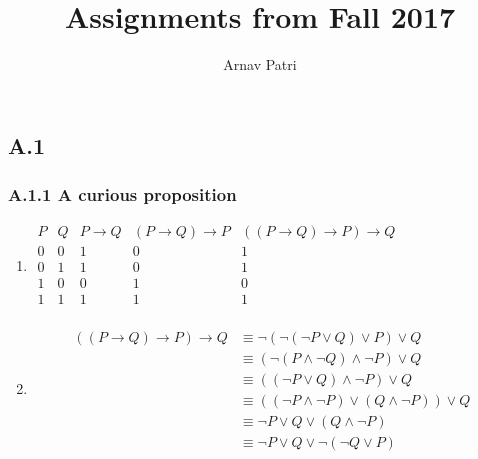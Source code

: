 \documentclass[12pt, letterpaper]{report}
\title{Assignments from Fall 2017}
\author{Arnav Patri}
\begin{document}
	\maketitle
	\part{} 
		\chapter{A.1}
			\section{A.1.1	A curious proposition}
            	\begin{flushleft}
            		\begin{enumerate}
						\item
							$
								\begin{array}{c|c|c|c|c}
									P & Q & P \to Q & (P \to Q) \to P & ((P \to Q) \to P) \to Q \\\hline
									0 & 0 & 1 & 0 & 1\\
									0 & 1 & 1 & 0 & 1\\ 
									1 & 0 & 0 & 1 & 0\\
									1 & 1 & 1 & 1 & 1\\
								\end{array}
							$
						\item		
							\begin{align*}
								((P\to Q)\to P)\to Q &\equiv \lnot(\lnot(\lnot P\lor Q)\lor P)\lor Q \\
									&\equiv(\lnot(P\land\lnot Q)\land\lnot P)\lor Q \\
									&\equiv((\lnot P\lor Q)\land\lnot P)\lor Q \\
									&\equiv((\lnot P\land\lnot P)\lor(Q\land\lnot P))\lor Q \\
									&\equiv\lnot P\lor Q\lor (Q\land\lnot P) \\
									&\equiv\lnot P\lor Q\lor\lnot(\lnot Q\lor P)
							\end{align*}
					\end{enumerate}
            	\end{flushleft}
\end{document}
